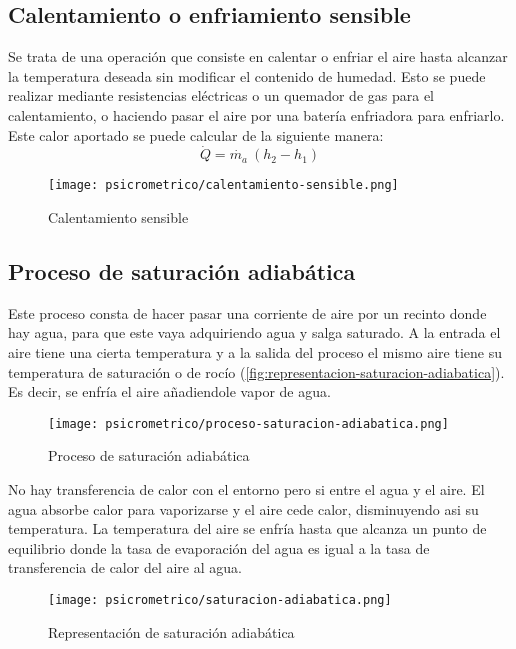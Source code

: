         \subsection{Calentamiento o enfriamiento sensible}

        Se trata de una operaci\'on que consiste en calentar o enfriar el aire hasta alcanzar la temperatura deseada sin modificar el contenido de humedad. Esto se puede realizar mediante resistencias el\'ectricas o un quemador de gas para el calentamiento, o haciendo pasar el aire por una bater\'ia enfriadora para enfriarlo. Este calor aportado se puede calcular de la siguiente manera:
        \begin{equation*}
            \dot{Q}=\dot{m_a}\ (h_2-h_1)
        \end{equation*}
         \begin{figure}[H]
             \centering
             \texttt{[image: psicrometrico/calentamiento-sensible.png]}
             \caption{Calentamiento sensible}
             \label{fig:calentamiento-sensible}
         \end{figure}
        
        \subsection{Proceso de saturaci\'on adiab\'atica}

        Este proceso consta de hacer pasar una corriente de aire por un recinto donde hay agua, para que este vaya adquiriendo agua y salga saturado. A la entrada el aire tiene una cierta temperatura y a la salida del proceso el mismo aire tiene su temperatura de saturaci\'on o de roc\'io (\autoref{fig:representacion-saturacion-adiabatica}). Es decir, se enfr\'ia el aire añadiendole vapor de agua.
         \begin{figure}[H]
             \centering
             \texttt{[image: psicrometrico/proceso-saturacion-adiabatica.png]}
             \caption{Proceso de saturaci\'on adiab\'atica}
             \label{fig:proceso-saturacion-adiabatica}
         \end{figure}
        No hay transferencia de calor con el entorno pero si entre el agua y el aire. El agua absorbe calor para vaporizarse y el aire cede calor, disminuyendo asi su temperatura. La temperatura del aire se enfría hasta que alcanza un punto de equilibrio donde la tasa de evaporación del agua es igual a la tasa de transferencia de calor del aire al agua.
         \begin{figure}[H]
             \centering
             \texttt{[image: psicrometrico/saturacion-adiabatica.png]}
             \caption{Representaci\'on de saturaci\'on adiab\'atica}
             \label{fig:representacion-saturacion-adiabatica}
         \end{figure}

